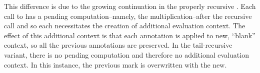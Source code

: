 This difference is due to the growing continuation in the properly recursive
. Each call to  has a pending computation--namely, the
multiplication--after the recursive call and so each necessitates the creation of
additional evaluation context. The effect of this additional context is that each
annotation is applied to new, ``blank'' context, so all the previous annotations are
preserved. In the tail-recursive variant, there is no pending computation and therefore no
additional evaluation context. In this instance, the previous mark is overwritten with the
new.

